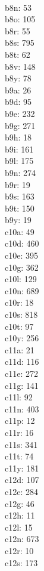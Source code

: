 \begin{multicols}{8}
  \\ b8n: 53
  \\ b8o: 105
  \\ b8r: 55
  \\ b8s: 795
  \\ b8t: 62
  \\ b8v: 148
  \\ b8y: 78
  \\ b9a: 26
  \\ b9d: 95
  \\ b9e: 232
  \\ b9g: 271
  \\ b9h: 18
  \\ b9i: 161
  \\ b9l: 175
  \\ b9n: 274
  \\ b9r: 19
  \\ b9s: 163
  \\ b9t: 150
  \\ b9y: 19
  \\ c10a: 49
  \\ c10d: 460
  \\ c10e: 395
  \\ c10g: 362
  \\ c10l: 129
  \\ c10n: 689
  \\ c10r: 18
  \\ c10s: 818
  \\ c10t: 97
  \\ c10y: 256
  \\ c11a: 21
  \\ c11d: 116
  \\ c11e: 272
  \\ c11g: 141
  \\ c11l: 92
  \\ c11n: 403
  \\ c11p: 12
  \\ c11r: 16
  \\ c11s: 341
  \\ c11t: 74
  \\ c11y: 181
  \\ c12d: 107
  \\ c12e: 284
  \\ c12g: 46
  \\ c12h: 11
  \\ c12l: 15
  \\ c12n: 673
  \\ c12r: 10
  \\ c12s: 173

\end{multicols}
